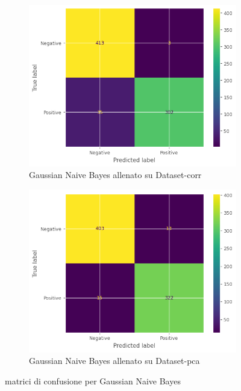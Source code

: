 \begin{figure}[!ht]
    \centering
    \begin{subfigure}{0.45\textwidth}
        \centering
        \includegraphics[width=\textwidth]{img/gnb/confusion_matrix_corr.png}
        \caption{Gaussian Naive Bayes allenato su Dataset-corr}
        \label{fig:matrice_di_confusione_per_GNB_corr}
    \end{subfigure}
    \hfill
    \begin{subfigure}{.45\textwidth}
        \centering
        \includegraphics[width=\textwidth]{img/gnb/confusion_matrix_pca.png}
        \caption{Gaussian Naive Bayes allenato su Dataset-pca}
        \label{fig:matrice_di_confusione_per_GNB_pca}
    \end{subfigure}
    \caption{matrici di confusione per Gaussian Naive Bayes}
    \label{fig:matrice_di_confusione_per_GNB}
\end{figure}


